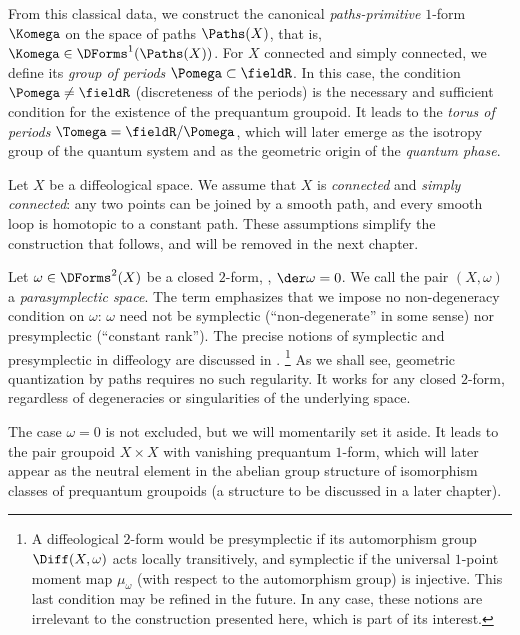 From this classical data,
we construct the canonical \emph{paths-primitive} $1$-form $\Komega$ on the space of paths $\Paths(X)$,
that is,
$\Komega \in\DForms^1(\Paths(X))$.
For $X$ connected and simply connected,
we define its \emph{group of periods} $\Pomega \subset \fieldR$.
In this case,
the condition $\Pomega \neq \fieldR$ (discreteness of the periods)
is the necessary and sufficient condition for the existence of the prequantum groupoid.
It leads to the \emph{torus of periods} $\Tomega = \fieldR/\Pomega$,
which will later emerge as the isotropy group of the quantum system
and as the geometric origin of the \emph{quantum phase}.

\begin{article}
  \label{art:classical-data}
  Let $X$ be a diffeological space.
  We assume that $X$ is \emph{connected} and \emph{simply connected}:
  any two points can be joined by a smooth path,
  and every smooth loop is homotopic to a constant path.
  These assumptions simplify the construction that follows,
  and will be removed in the next chapter.
  
  Let $\omega \in \DForms^2(X)$ be a closed $2$-form,
  \ie,
  $\der\omega = 0$.
  We call the pair $(X,\omega)$ a \emph{parasymplectic space}.
  The term emphasizes that we impose no non-degeneracy condition on $\omega$:
  $\omega$ need not be symplectic (``non-degenerate'' in some sense) nor presymplectic (``constant rank'').
  The precise notions of symplectic and presymplectic in diffeology are discussed in \cite{PIZ10}.%
  \footnote{A diffeological $2$-form would be presymplectic if its automorphism group $\Diff(X,\omega)$ acts locally transitively,
  and symplectic if the universal $1$-point moment map $\mu_\omega$ (with respect to the automorphism group) is injective.
  This last condition may be refined in the future.
  In any case,
  these notions are irrelevant to the construction presented here,
  which is part of its interest.}
  As we shall see,
  geometric quantization by paths requires no such regularity.
  It works for any closed $2$-form,
  regardless of degeneracies or singularities of the underlying space.
  
  The case $\omega = 0$ is not excluded,
  but we will momentarily set it aside.
  It leads to the pair groupoid $X \times X$ with vanishing prequantum $1$-form,
  which will later appear as the neutral element in the abelian group structure
  of isomorphism classes of prequantum groupoids
  (a structure to be discussed in a later chapter).
\end{article}

